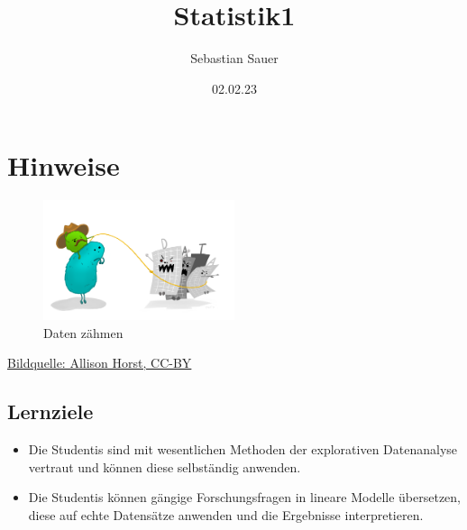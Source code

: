 \documentclass[
  a4paper,
  DIV=11]{scrreprt}
\title{Statistik1}
\author{Sebastian Sauer}
\date{02.02.23}
\renewcommand*\contentsname{Inhaltsverzeichnis}
\newcommand\contentsname{Inhaltsverzeichnis}
\theoremstyle{definition}
\theoremstyle{definition}
\theoremstyle{remark}
\begin{document}
\maketitle
\ifdefined\Shaded\renewenvironment{Shaded}{\begin{tcolorbox}[borderline west={3pt}{0pt}{shadecolor}, frame hidden, breakable, boxrule=0pt, interior hidden, sharp corners, enhanced]}{\end{tcolorbox}}\fi

\renewcommand*\contentsname{Inhaltsverzeichnis}
{
\hypersetup{linkcolor=}
\setcounter{tocdepth}{2}
\tableofcontents
}

\hypertarget{hinweise}{%
\chapter*{Hinweise}\label{hinweise}}


\begin{figure}

{\centering \includegraphics[width=0.5\textwidth,height=\textheight]{./img/datenzaehmen.png}

}

\caption{Daten zähmen}

\end{figure}

\href{https://github.com/allisonhorst/stats-illustrations}{Bildquelle:
Allison Horst, CC-BY}

\hypertarget{lernziele}{%
\section*{Lernziele}\label{lernziele}}


\begin{itemize}
\item
  Die Studentis sind mit wesentlichen Methoden der explorativen
  Datenanalyse vertraut und können diese selbständig anwenden.
\item
  Die Studentis können gängige Forschungsfragen in lineare Modelle
  übersetzen, diese auf echte Datensätze anwenden und die Ergebnisse
  interpretieren.
\end{itemize}
\end{document}
